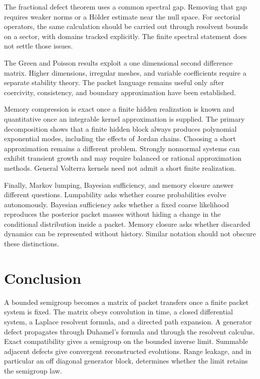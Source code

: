\documentclass[11pt,letterpaper]{article}
\theoremstyle{plain}
\theoremstyle{plain}
\theoremstyle{plain}
\theoremstyle{definition}
\theoremstyle{definition}
\theoremstyle{definition}
\theoremstyle{definition}
\theoremstyle{definition}
\theoremstyle{remark}
\theoremstyle{remark}
\theoremstyle{remark}
\theoremstyle{remark}
\theoremstyle{remark}
\theoremstyle{remark}
\begin{document}
The fractional defect theorem uses a common spectral gap. Removing that gap requires weaker norms or a Hölder estimate near the null space. For sectorial operators, the same calculation should be carried out through resolvent bounds on a sector, with domains tracked explicitly. The finite spectral statement does not settle those issues.

The Green and Poisson results exploit a one dimensional second difference matrix. Higher dimensions, irregular meshes, and variable coefficients require a separate stability theory. The packet language remains useful only after coercivity, consistency, and boundary approximation have been established.

Memory compression is exact once a finite hidden realization is known and quantitative once an integrable kernel approximation is supplied. The primary decomposition shows that a finite hidden block always produces polynomial exponential modes, including the effects of Jordan chains. Choosing a short approximation remains a different problem. Strongly nonnormal systems can exhibit transient growth and may require balanced or rational approximation methods. General Volterra kernels need not admit a short finite realization.

Finally, Markov lumping, Bayesian sufficiency, and memory closure answer different questions. Lumpability asks whether coarse probabilities evolve autonomously. Bayesian sufficiency asks whether a fixed coarse likelihood reproduces the posterior packet masses without hiding a change in the conditional distribution inside a packet. Memory closure asks whether discarded dynamics can be represented without history. Similar notation should not obscure these distinctions.

\FloatBarrier
\section{Conclusion}\label{extended:section:19}\label{extended:sec:conclusion}

A bounded semigroup becomes a matrix of packet transfers once a finite packet system is fixed. The matrix obeys convolution in time, a closed differential system, a Laplace resolvent formula, and a directed path expansion. A generator defect propagates through Duhamel's formula and through the resolvent calculus. Exact compatibility gives a semigroup on the bounded inverse limit. Summable adjacent defects give convergent reconstructed evolutions. Range leakage, and in particular an off diagonal generator block, determines whether the limit retains the semigroup law.
\end{document}
